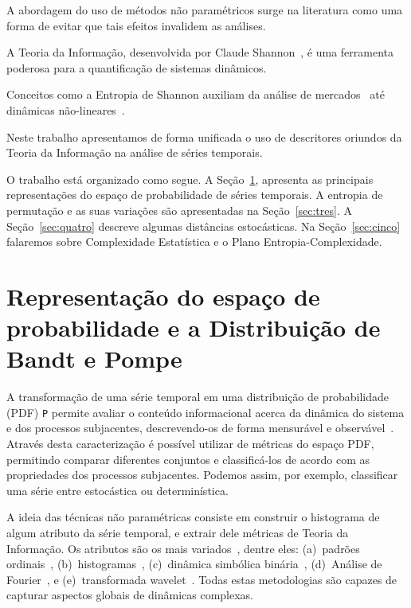 \documentclass[12pt]{article}
\begin{document}
A abordagem do uso de métodos não paramétricos surge na literatura como uma forma de evitar que tais efeitos invalidem as análises.

A Teoria da Informação, desenvolvida por Claude Shannon~\cite{shannon}, é uma ferramenta poderosa para a quantificação de sistemas dinâmicos.

Conceitos como a Entropia de Shannon auxiliam da análise de mercados~\cite{hart} até dinâmicas não-lineares~\cite{fisherRosso}.

Neste trabalho apresentamos de forma unificada o uso de descritores oriundos da Teoria da Informação na análise de séries temporais.

O trabalho está organizado como segue.
A Seção~\ref{sec:dois}, apresenta as principais representações do espaço de probabilidade de séries temporais. 
A entropia de permutação e as suas variações são apresentadas na Seção~\ref{sec:tres}. 
A Seção~\ref{sec:quatro} descreve algumas distâncias estocásticas. 
Na Seção~\ref{sec:cinco} falaremos sobre Complexidade Estatística e o Plano Entropia-Complexidade.

\section{Representação do espaço de probabilidade e a Distribuição de Bandt e Pompe}
\label{sec:dois}

A transformação de uma série temporal em uma distribuição de probabilidade (PDF) \texttt P permite avaliar o conteúdo informacional acerca da dinâmica do sistema e dos processos subjacentes, descrevendo-os de forma mensurável e observável~\cite{entropyAndInformationTheory}.
Através desta caracterização é possível utilizar de métricas do espaço PDF, permitindo comparar diferentes conjuntos e classificá-los de acordo com as propriedades dos processos subjacentes. 
Podemos assim, por exemplo, classificar uma série entre estocástica ou determinística.

A ideia das técnicas não paramétricas consiste em construir o histograma de algum atributo da série temporal, e extrair dele métricas de Teoria da Informação.
Os atributos são os mais variados~\cite{Kowalski2011DistancesIP}, dentre eles: 
(a)~padrões ordinais~\cite{ROSSO2}, 
(b)~histogramas~\cite{article3,DEMICCO20083373},
(c)~dinâmica simbólica binária~\cite{PhysRevLett}, 
(d)~Análise de Fourier~\cite{article}, e 
(e)~transformada wavelet~\cite{ROSSO3}. 
Todas estas metodologias são capazes de capturar aspectos globais de dinâmicas complexas. 
\end{document}
